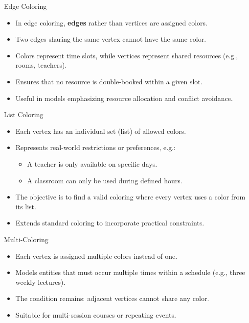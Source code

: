 \documentclass[10pt]{beamer}
\begin{document}
\begin{frame}{Edge Coloring}
    \small
    \begin{itemize}
        \item In edge coloring, \textbf{edges} rather than vertices are assigned colors.
        \item Two edges sharing the same vertex cannot have the same color.
        \item Colors represent time slots, while vertices represent shared resources (e.g., rooms, teachers).
        \item Ensures that no resource is double-booked within a given slot.
        \item Useful in models emphasizing resource allocation and conflict avoidance.
    \end{itemize}
\end{frame}

\begin{frame}{List Coloring}
    \small
    \begin{itemize}
        \item Each vertex has an individual set (list) of allowed colors.
        \item Represents real-world restrictions or preferences, e.g.:
        \begin{itemize}
            \item A teacher is only available on specific days.
            \item A classroom can only be used during defined hours.
        \end{itemize}
        \item The objective is to find a valid coloring where every vertex uses a color from its list.
        \item Extends standard coloring to incorporate practical constraints.
    \end{itemize}
\end{frame}

\begin{frame}{Multi-Coloring}
    \small
    \begin{itemize}
        \item Each vertex is assigned multiple colors instead of one.
        \item Models entities that must occur multiple times within a schedule (e.g., three weekly lectures).
        \item The condition remains: adjacent vertices cannot share any color.
        \item Suitable for multi-session courses or repeating events.
    \end{itemize}
\end{frame}
\end{document}
